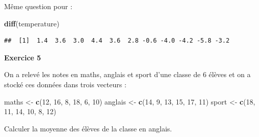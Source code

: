 \documentclass[12pt,]{book}
\newenvironment{Shaded}{\begin{snugshade}}{\end{snugshade}}
\newcommand{\DecValTok}[1]{\textcolor[rgb]{0.06,0.06,0.06}{#1}}
\newcommand{\KeywordTok}[1]{\textcolor[rgb]{0.27,0.27,0.27}{\textbf{#1}}}
\newcommand{\NormalTok}[1]{#1}
\newcommand{\StringTok}[1]{\textcolor[rgb]{0.5,0.5,0.5}{#1}}
\begin{document}
Même question pour :

\begin{Shaded}
\begin{Highlighting}[]
\KeywordTok{diff}\NormalTok{(temperature)}
\end{Highlighting}
\end{Shaded}

\begin{verbatim}
##  [1]  1.4  3.6  3.0  4.4  3.6  2.8 -0.6 -4.0 -4.2 -5.8 -3.2
\end{verbatim}

\textbf{Exercice 5}

On a relevé les notes en maths, anglais et sport d'une classe de 6 élèves et on a stocké ces données dans trois vecteurs :

\begin{Shaded}
\begin{Highlighting}[]
\NormalTok{maths <-}\StringTok{ }\KeywordTok{c}\NormalTok{(}\DecValTok{12}\NormalTok{, }\DecValTok{16}\NormalTok{, }\DecValTok{8}\NormalTok{, }\DecValTok{18}\NormalTok{, }\DecValTok{6}\NormalTok{, }\DecValTok{10}\NormalTok{)}
\NormalTok{anglais <-}\StringTok{ }\KeywordTok{c}\NormalTok{(}\DecValTok{14}\NormalTok{, }\DecValTok{9}\NormalTok{, }\DecValTok{13}\NormalTok{, }\DecValTok{15}\NormalTok{, }\DecValTok{17}\NormalTok{, }\DecValTok{11}\NormalTok{)}
\NormalTok{sport <-}\StringTok{ }\KeywordTok{c}\NormalTok{(}\DecValTok{18}\NormalTok{, }\DecValTok{11}\NormalTok{, }\DecValTok{14}\NormalTok{, }\DecValTok{10}\NormalTok{, }\DecValTok{8}\NormalTok{, }\DecValTok{12}\NormalTok{)}
\end{Highlighting}
\end{Shaded}

Calculer la moyenne des élèves de la classe en anglais.
\end{document}
